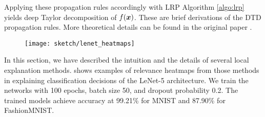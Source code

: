 Applying these propagation rules accordingly with LRP Algorithm \ref{algo:lrp} yields deep Taylor decomposition of  $f(\boldsymbol{x})$. These are brief derivations of the DTD propagation rules. More theoretical details can be found in the original paper \citep{MontavonExplainingnonlinearclassification2017}.





\begin{figure}[!htb]
\centering
\texttt{[image: sketch/lenet\_heatmaps]}
\label{fig:lenet_heatmaps}
\end{figure}

In this section, we have described the intuition and the details of several local explanation methods. \addfigure{\ref{fig:lenet_heatmaps}} shows  examples of relevance heatmaps from those methods in explaining classification decisions of the LeNet-5 \citep{LeCunGradientBasedLearningApplied2001} architecture. We train the networks with 100 epochs, batch size 50, and dropout probability 0.2. The trained models achieve accuracy at 99.21\% for MNIST and 87.90\% for FashionMNIST. 

